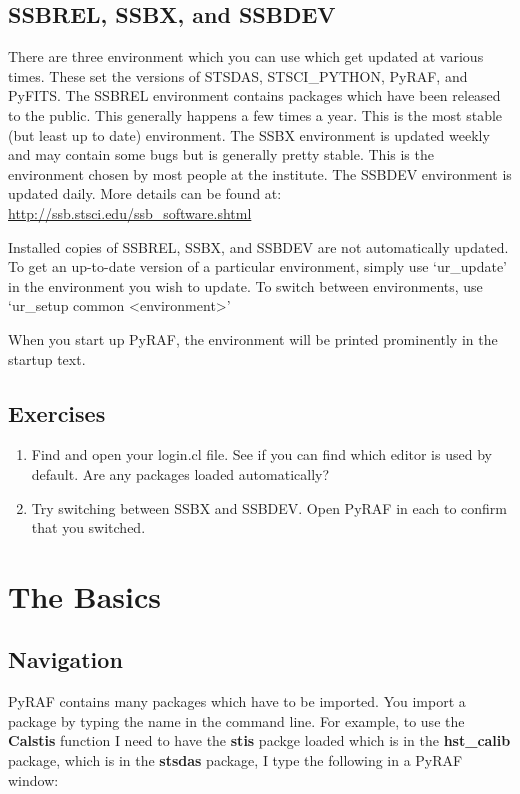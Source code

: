 \subsection{SSBREL, SSBX, and SSBDEV}
There are three environment which you can use which get updated at various times. These set the versions of STSDAS, STSCI\_PYTHON, PyRAF, and PyFITS. The SSBREL environment contains packages which have been released to the public. This generally happens a few times a year. This is the most stable (but least up to date) environment. The SSBX environment is updated weekly and may contain some bugs but is generally pretty stable. This is the environment chosen by most people at the institute. The SSBDEV environment is updated daily. More details can be found at: \url{http://ssb.stsci.edu/ssb_software.shtml}

Installed copies of SSBREL, SSBX, and SSBDEV are not automatically updated.  To get an up-to-date version of a particular environment, simply use `ur\_update' in the environment you wish to update.  To switch between environments, use `ur\_setup common <environment>'

When you start up PyRAF, the environment will be printed prominently in the startup text.

\subsection{Exercises}
\begin{enumerate}
\item Find and open your login.cl file.  See if you can find which editor is used by default. Are any packages loaded automatically? 
\item Try switching between SSBX and SSBDEV. Open PyRAF in each to confirm that you switched.
\end{enumerate}

\section{The Basics}
\subsection{Navigation}
PyRAF contains many packages which have to be imported. You import a package by typing the name in the command line. For example, to use the {\bf Calstis} function I need to have the {\bf stis} packge loaded which is in the {\bf hst\_calib} package, which is in the {\bf stsdas} package,  I type the following in a PyRAF window:

